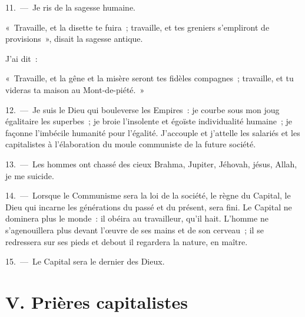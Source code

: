 \documentclass[french,twoside]{book} %
\newcommand\chapteropen{} %
\newcommand\chaptercont{} %
\newcommand\chapterclose{} %
\begin{document}
11. — Je ris de la sagesse humaine.\par
« Travaille, et la disette te fuira ; travaille, et tes greniers s’empliront de provisions », disait la sagesse antique.\par
J'ai dit :\par
« Travaille, et la gêne et la misère seront tes fidèles compagnes ; travaille, et tu videras ta maison au Mont-de-piété. »\par
12. — Je suis le Dieu qui bouleverse les Empires : je courbe sous mon joug égalitaire les superbes ; je broie l’insolente et égoïste individualité humaine ; je façonne l’imbécile humanité pour l’égalité. J'accouple et j’attelle les salariés et les capitalistes à l’élaboration du moule communiste de la future société.\par
13. — Les hommes ont chassé des cieux Brahma, Jupiter, Jéhovah, jésus, Allah, je me suicide.\par
14. — Lorsque le Communisme sera la loi de la société, le règne du Capital, le Dieu qui incarne les générations du passé et du présent, sera fini. Le Capital ne dominera plus le monde : il obéira au travailleur, qu’il hait. L'homme ne s’agenouillera plus devant l’œuvre de ses mains et de son cerveau ; il se redressera sur ses pieds et debout il regardera la nature, en maître.\par
15. — Le Capital sera le dernier des Dieux.
\chapterclose


\chapteropen
\chapter[{V. Prières capitalistes}]{V. Prières capitalistes}\renewcommand{\leftmark}{V. Prières capitalistes}


\chaptercont
\end{document}

